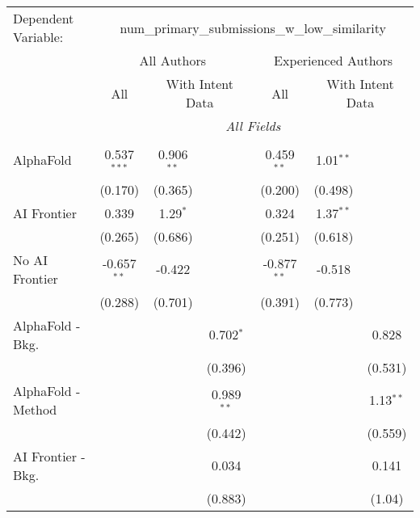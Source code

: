 \begingroup
\centering
\begin{tabular}{lcccccc}
   \tabularnewline \midrule \midrule
   Dependent Variable: & \multicolumn{6}{c}{num\_primary\_submissions\_w\_low\_similarity}\\
 & \multicolumn{3}{c}{All Authors} & \multicolumn{3}{c}{Experienced Authors} \\
\cmidrule(lr){2-4} \cmidrule(lr){5-7}
 & \multicolumn{1}{c}{All} & \multicolumn{2}{c}{With Intent Data} & \multicolumn{1}{c}{All} & \multicolumn{2}{c}{With Intent Data} \\
\cmidrule(lr){2-2} \cmidrule(lr){3-4} \cmidrule(lr){5-5} \cmidrule(lr){6-7}
 & \multicolumn{6}{c}{\textit{All Fields}} \\ \\
   AlphaFold               & 0.537$^{***}$ & 0.906$^{**}$ &              & 0.459$^{**}$  & 1.01$^{**}$ &   \\   
                           & (0.170)       & (0.365)      &              & (0.200)       & (0.498)     &   \\   
   AI Frontier             & 0.339         & 1.29$^{*}$   &              & 0.324         & 1.37$^{**}$ &   \\   
                           & (0.265)       & (0.686)      &              & (0.251)       & (0.618)     &   \\   
   No AI Frontier          & -0.657$^{**}$ & -0.422       &              & -0.877$^{**}$ & -0.518      &   \\   
                           & (0.288)       & (0.701)      &              & (0.391)       & (0.773)     &   \\   
   AlphaFold - Bkg.        &               &              & 0.702$^{*}$  &               &             & 0.828\\   
                           &               &              & (0.396)      &               &             & (0.531)\\   
   AlphaFold - Method      &               &              & 0.989$^{**}$ &               &             & 1.13$^{**}$\\   
                           &               &              & (0.442)      &               &             & (0.559)\\   
   AI Frontier - Bkg.      &               &              & 0.034        &               &             & 0.141\\   
                           &               &              & (0.883)      &               &             & (1.04)\\   

\end{tabular}
